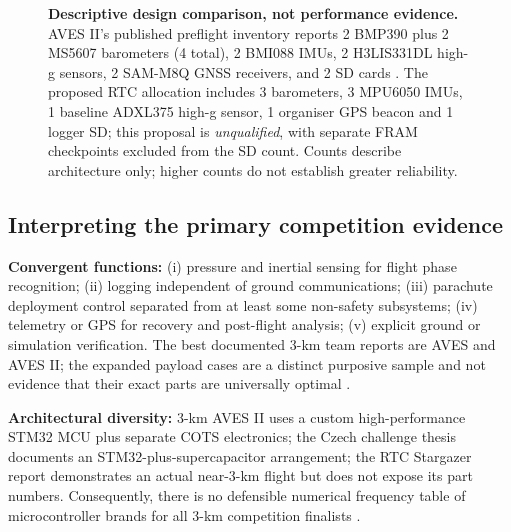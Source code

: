 \documentclass[10pt,a4paper]{article}
\begin{document}
\begin{figure}[htbp]\centering
{}
\caption{\textbf{Descriptive design comparison, not performance evidence.} AVES II's published preflight inventory reports 2 BMP390 plus 2 MS5607 barometers (4 total), 2 BMI088 IMUs, 2 H3LIS331DL high-g sensors, 2 SAM-M8Q GNSS receivers, and 2 SD cards \cite{astg2022aves2}. The proposed RTC allocation includes 3 barometers, 3 MPU6050 IMUs, 1 baseline ADXL375 high-g sensor, 1 organiser GPS beacon and 1 logger SD; this proposal is \emph{unqualified}, with separate FRAM checkpoints excluded from the SD count. Counts describe architecture only; higher counts do not establish greater reliability.}
\label{fig:aves2}
\end{figure}

\subsection{Interpreting the primary competition evidence}
\textbf{Convergent functions:} (i) pressure and inertial sensing for flight phase recognition; (ii) logging independent of ground communications; (iii) parachute deployment control separated from at least some non-safety subsystems; (iv) telemetry or GPS for recovery and post-flight analysis; (v) explicit ground or simulation verification. The best documented 3-km team reports are AVES and AVES II; the expanded payload cases are a distinct purposive sample and not evidence that their exact parts are universally optimal \cite{astg2021aves,astg2022aves2}.

\textbf{Architectural diversity:} 3-km AVES II uses a custom high-performance STM32 MCU plus separate COTS electronics; the Czech challenge thesis documents an STM32-plus-supercapacitor arrangement; the RTC Stargazer report demonstrates an actual near-3-km flight but does not expose its part numbers. Consequently, there is no defensible numerical frequency table of microcontroller brands for all 3-km competition finalists \cite{astg2022aves2,zapadlo2023,stargazer2026}.
\end{document}
